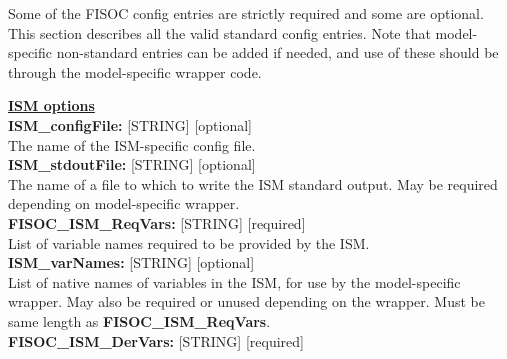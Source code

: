 \documentclass[11pt]{article}
\begin{document}
Some of the FISOC config entries are strictly required and some are optional.
This section describes all the valid standard config entries. 
Note that model-specific non-standard entries can be added if needed, and use of these 
should be through the model-specific wrapper code.


\begin{flushleft}
\textbf{\underline{ISM options}} \\
\vspace{6pt}
\textbf{ISM\_configFile:}     [STRING] [optional]                          \\
The name of the ISM-specific config file.                                  \\
\vspace{6pt}
\textbf{ISM\_stdoutFile:}     [STRING] [optional]                          \\
The name of a file to which to write the ISM standard output.  May be 
required depending on model-specific wrapper.                              \\
\vspace{6pt}
\textbf{FISOC\_ISM\_ReqVars:} [STRING] [required]                          \\
List of variable names required to be provided by the ISM.                 \\
\vspace{6pt}
\textbf{ISM\_varNames:} [STRING] [optional]                                \\
List of native names of variables in the ISM, for use by the model-specific 
wrapper.  May also be required or unused depending on the wrapper. Must be 
same length as \textbf{FISOC\_ISM\_ReqVars}.                               \\
\vspace{6pt}
\textbf{FISOC\_ISM\_DerVars:} [STRING] [required]                          \\

\end{flushleft}
\end{document}

